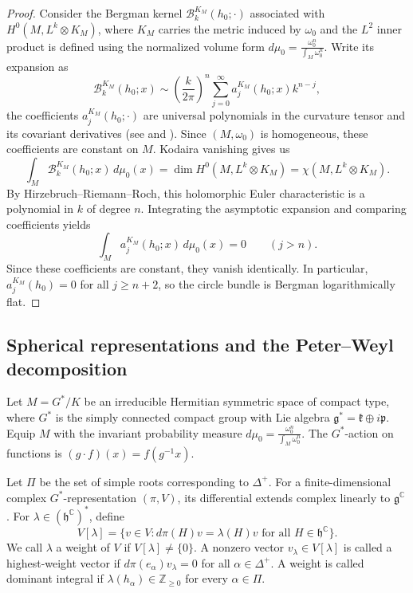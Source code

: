 \documentclass[11pt,reqno]{amsart}
\theoremstyle{corollary}
\theoremstyle{conjecture}
\theoremstyle{assumption}
\theoremstyle{proposition}
\theoremstyle{remark}
\numberwithin{equation}{section}
\begin{document}
\begin{proof}
Consider the Bergman kernel $\mathcal B^{K_M}_k(h_0;\cdot)$ associated with $H^0(M,L^k\otimes K_M)$, where $K_M$ carries the metric induced by $\omega_0$ and the $L^2$ inner product is defined using the normalized volume form $d\mu_0=\frac{\omega_0^n}{\int_M\omega_0^n}$. Write its expansion as 
\[
\mathcal B^{K_M}_k(h_0;x)\sim\left(\frac{k}{2\pi}\right)^n\sum_{j=0}^{\infty}a^{K_M}_j(h_0;x)k^{n-j},
\]
the coefficients $a^{K_M}_j(h_0;\cdot)$ are universal polynomials in the curvature tensor and its covariant derivatives (see \cite[Theorem~1.1]{Lu2000} and \cite[Proposition~1.5]{EbenfeltXiaoXu2026}). Since $(M,\omega_0)$ is homogeneous, these coefficients are constant on $M$. Kodaira vanishing gives us
\[
\int_M \mathcal B^{K_M}_k(h_0;x)\,d\mu_0(x)=\operatorname{dim} H^0(M,L^k\otimes K_M)=\chi(M,L^k\otimes K_M).
\]
By Hirzebruch--Riemann--Roch, this holomorphic Euler characteristic is a polynomial in $k$ of degree $n$. Integrating the asymptotic expansion and comparing coefficients yields
\[
\int_M a^{K_M}_j(h_0;x)\,d\mu_0(x)=0\qquad(j>n).
\]
Since these coefficients are constant, they vanish identically. In particular, $a^{K_M}_j(h_0)=0$ for all $j\geq n+2$, so the circle bundle is Bergman logarithmically flat.
\end{proof}

\subsection{Spherical representations and the Peter--Weyl decomposition}\label{subsec:peter-weyl}

Let $M=G^*/K$ be an irreducible Hermitian symmetric space of compact type, where $G^*$ is the simply connected compact group with Lie algebra $\mathfrak g^*=\mathfrak k\oplus i\mathfrak p$. Equip $M$ with the invariant probability measure $d\mu_0=\frac{\omega_0^n}{\int_M\omega_0^n}$. The $G^*$-action on functions is $(g\cdot f)(x)=f(g^{-1}x)$.

Let $\Pi$ be the set of simple roots corresponding to $\Delta^+$. For a finite-dimensional complex $G^*$-representation $(\pi,V)$, its differential extends complex linearly to $\mathfrak g^{\mathbb C}$. For $\lambda\in(\mathfrak h^{\mathbb C})^*$, define
\[
V[\lambda]=\{v\in V\colon d\pi(H)v=\lambda(H)v\text{ for all }H\in\mathfrak h^{\mathbb C}\}.
\]
We call $\lambda$ a weight of $V$ if $V[\lambda]\neq\{0\}$. A nonzero vector $v_\lambda\in V[\lambda]$ is called a highest-weight vector if $d\pi(e_\alpha)v_\lambda=0$ for all $\alpha\in\Delta^+$. A weight is called dominant integral if $\lambda(h_\alpha)\in\mathbb Z_{\geq 0}$ for every $\alpha\in\Pi$.
\end{document}
